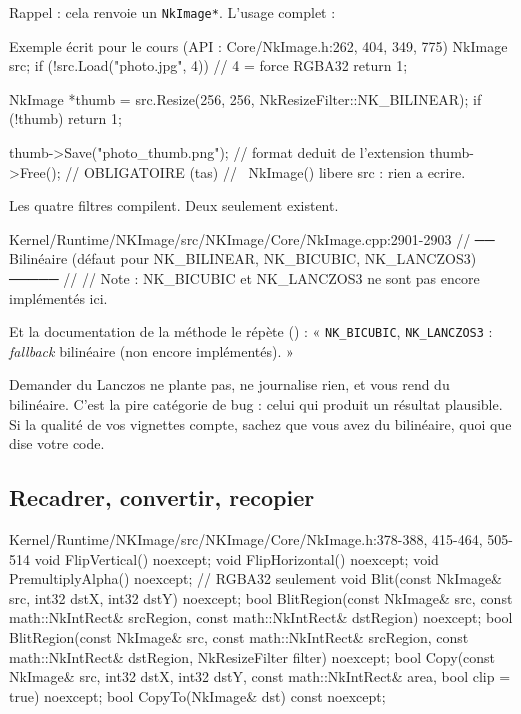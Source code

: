 Rappel : cela renvoie un \texttt{NkImage*}. L'usage complet :

\begin{nkcode}{Exemple écrit pour le cours (API : Core/NkImage.h:262, 404, 349, 775)}
NkImage src;
if (!src.Load("photo.jpg", 4))            // 4 = force RGBA32
    return 1;

NkImage *thumb = src.Resize(256, 256, NkResizeFilter::NK_BILINEAR);
if (!thumb) return 1;

thumb->Save("photo_thumb.png");           // format deduit de l'extension
thumb->Free();                            // OBLIGATOIRE (tas)
// ~NkImage() libere src : rien a ecrire.
\end{nkcode}

\begin{nkpiege}
Les quatre filtres compilent. Deux seulement existent.

\begin{nkcode}{Kernel/Runtime/NKImage/src/NKImage/Core/NkImage.cpp:2901-2903}
            // ── Bilinéaire (défaut pour NK_BILINEAR, NK_BICUBIC, NK_LANCZOS3) ─────
            //
            // Note : NK_BICUBIC et NK_LANCZOS3 ne sont pas encore implémentés ici.
\end{nkcode}

Et la documentation de la méthode le répète () :
« \texttt{NK\_BICUBIC}, \texttt{NK\_LANCZOS3} : \emph{fallback} bilinéaire (non
encore implémentés). »

Demander du Lanczos ne plante pas, ne journalise rien, et vous rend du
bilinéaire. C'est la pire catégorie de bug : celui qui produit un résultat
plausible. Si la qualité de vos vignettes compte, sachez que vous avez du
bilinéaire, quoi que dise votre code.
\end{nkpiege}

\subsection{Recadrer, convertir, recopier}

\begin{nkcode}{Kernel/Runtime/NKImage/src/NKImage/Core/NkImage.h:378-388, 415-464, 505-514}
void FlipVertical()   noexcept;
void FlipHorizontal() noexcept;
void PremultiplyAlpha() noexcept;                                 // RGBA32 seulement
void Blit(const NkImage& src, int32 dstX, int32 dstY) noexcept;
bool BlitRegion(const NkImage& src, const math::NkIntRect& srcRegion,
                const math::NkIntRect& dstRegion) noexcept;
bool BlitRegion(const NkImage& src, const math::NkIntRect& srcRegion,
                const math::NkIntRect& dstRegion, NkResizeFilter filter) noexcept;
bool Copy(const NkImage& src, int32 dstX, int32 dstY,
          const math::NkIntRect& area, bool clip = true) noexcept;
bool CopyTo(NkImage& dst) const noexcept;
\end{nkcode}

